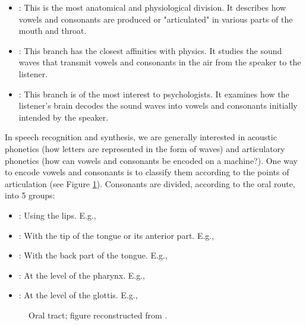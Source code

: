 \documentclass{KBook}
\begin{document}
\begin{itemize}
	\item {}: This is the most anatomical and physiological division. It describes how vowels and consonants are produced or "articulated" in various parts of the mouth and throat.
	\item {}: This branch has the closest affinities with physics. It studies the sound waves that transmit vowels and consonants in the air from the speaker to the listener.
	\item {}: This branch is of the most interest to psychologists. It examines how the listener's brain decodes the sound waves into vowels and consonants initially intended by the speaker.
\end{itemize}

In speech recognition and synthesis, we are generally interested in acoustic phonetics (how letters are represented in the form of waves) and articulatory phonetics (how can vowels and consonants be encoded on a machine?). One way to encode vowels and consonants is to classify them according to the points of articulation (see Figure \ref{fig:articulation}). Consonants are divided, according to the oral route, into 5 groups:

\begin{itemize}
	\item {}: Using the lips. E.g., \expword{\textipa{[b], [p], [m], [f], [v]}}
	\item {}: With the tip of the tongue or its anterior part. E.g., 
	\item {}: With the back part of the tongue. E.g., 
	\item {}: At the level of the pharynx. E.g., 
	\item {}: At the level of the glottis. E.g., 
\end{itemize}

\begin{figure}[ht]
	\centering 
	\caption[Oral tract.]{Oral tract; figure reconstructed from \cite{2009-ball}.}
	\label{fig:articulation}
\end{figure}
\end{document}
